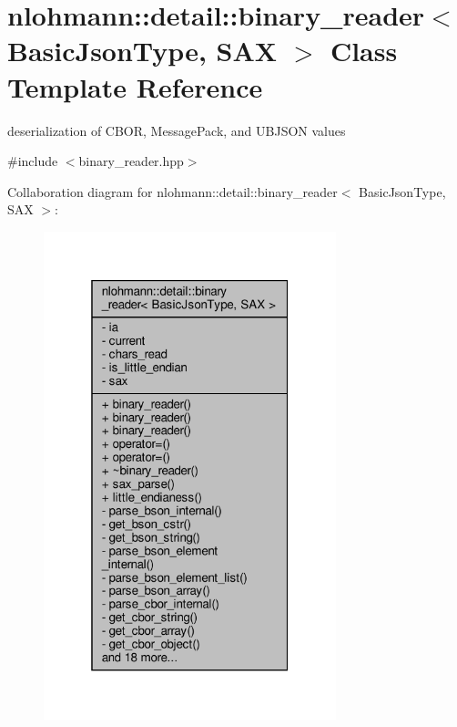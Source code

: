 \hypertarget{classnlohmann_1_1detail_1_1binary__reader}{}\section{nlohmann\+:\+:detail\+:\+:binary\+\_\+reader$<$ Basic\+Json\+Type, S\+AX $>$ Class Template Reference}
\label{classnlohmann_1_1detail_1_1binary__reader}


deserialization of C\+B\+OR, Message\+Pack, and U\+B\+J\+S\+ON values  




{\ttfamily \#include $<$binary\+\_\+reader.\+hpp$>$}



Collaboration diagram for nlohmann\+:\+:detail\+:\+:binary\+\_\+reader$<$ Basic\+Json\+Type, S\+AX $>$\+:\nopagebreak
\begin{figure}[H]
\begin{center}
\leavevmode
\includegraphics[width=241pt]{classnlohmann_1_1detail_1_1binary__reader__coll__graph}
\end{center}
\end{figure}
